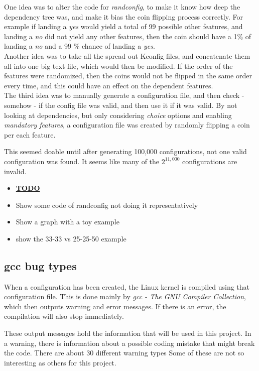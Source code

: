 \documentclass[a4paper,11pt]{article}
\begin{document}
One idea was to alter the code for \emph{randconfig}, to make it know how deep 
the dependency tree was, and make it bias the coin flipping process correctly. 
For example if landing a \emph{yes} would yield a total of 99 possible other 
features, and landing a \emph{no} did not yield any other features, then the 
coin should have a 1\% of landing a \emph{no} and a 99 \% chance of landing a 
\emph{yes}. \\


Another idea was to take all the spread out Kconfig files, and concatenate 
them all into one big text file, which would then be modified. If the order of 
the features were randomized, then the coins would not be flipped in the same 
order every time, and this could have an effect on the dependent features. \\

The third idea was to manually generate a configuration file, and then check - 
somehow - if the config file was valid, and then use it if it was valid. By 
not looking at dependencies, but only considering \emph{choice} options and 
enabling \emph{mandatory features}, a configuration file was created by 
randomly flipping a coin per each feature.

This seemed doable until after generating 100,000 configurations, not one 
valid configuration was found. It seems like many of the $2^{11,000}$ 
configurations are invalid.


\begin{itemize}
    \item \underline{\textbf{TODO}}
    \item Show some code of randconfig not doing it representatively
    \item Show a graph with a toy example
    \item show the 33-33 vs 25-25-50 example
\end{itemize}


\subsection{gcc bug types}

When a configuration has been created, the Linux kernel is compiled using 
that configuration file. This is done mainly by \emph{gcc - The GNU Compiler 
Collection}, which then outputs warning and error 
messages. If there is an error, the compilation will also stop immediately.

These output messages hold the information that will be used in this project. 
In a warning, there is information about a possible coding mistake that might 
break the code. There are about 30 different warning types \cite{gccwarnings}
Some of these are not so interesting as others for this project.\\
\end{document}
